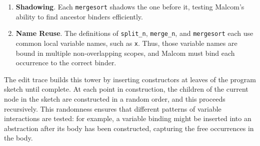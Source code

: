 
\begin{enumerate}
    \item \textbf{Shadowing}. Each \texttt{mergesort} shadows the one before it, testing Malcom's ability to find ancestor binders efficiently.
    \item \textbf{Name Reuse}. The definitions of \texttt{split\_n}, \texttt{merge\_n}, and \texttt{mergesort} each use common local variable names, such as \texttt{x}. Thus, those variable names are bound in multiple non-overlapping scopes, and Malcom must bind each occurrence to the correct binder.
\end{enumerate}

The edit trace builds this tower by inserting constructors at leaves of the program sketch until complete. At each point in construction, the children of the current node in the sketch are constructed in a random order, and this proceeds recursively. This randomness ensures that different patterns of variable interactions are tested: for example, a variable binding might be inserted into an abstraction after its body has been constructed, capturing the free occurrences in the body.

